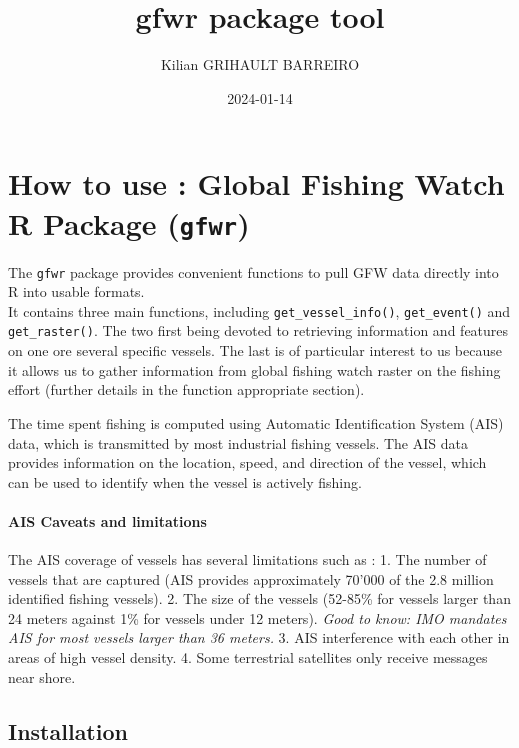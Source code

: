\documentclass[
]{article}
\title{gfwr package tool}
\author{Kilian GRIHAULT BARREIRO}
\date{2024-01-14}
\begin{document}
\maketitle

\hypertarget{how-to-use-global-fishing-watch-r-package-gfwr}{%
\section{\texorpdfstring{How to use : Global Fishing Watch R Package
(\texttt{gfwr})}{How to use : Global Fishing Watch R Package (gfwr)}}\label{how-to-use-global-fishing-watch-r-package-gfwr}}

The \texttt{gfwr} package provides convenient functions to pull GFW data
directly into R into usable formats.\\
It contains three main functions, including
\texttt{get\_vessel\_info()}, \texttt{get\_event()} and
\texttt{get\_raster()}. The two first being devoted to retrieving
information and features on one ore several specific vessels. The last
is of particular interest to us because it allows us to gather
information from global fishing watch raster on the fishing effort
(further details in the function appropriate section).

The time spent fishing is computed using Automatic Identification System
(AIS) data, which is transmitted by most industrial fishing vessels. The
AIS data provides information on the location, speed, and direction of
the vessel, which can be used to identify when the vessel is actively
fishing.

\hypertarget{ais-caveats-and-limitations}{%
\paragraph{AIS Caveats and
limitations}\label{ais-caveats-and-limitations}}

The AIS coverage of vessels has several limitations such as : 1. The
number of vessels that are captured (AIS provides approximately 70'000
of the 2.8 million identified fishing vessels). 2. The size of the
vessels (52-85\% for vessels larger than 24 meters against 1\% for
vessels under 12 meters). \emph{Good to know: IMO mandates AIS for most
vessels larger than 36 meters.} 3. AIS interference with each other in
areas of high vessel density. 4. Some terrestrial satellites only
receive messages near shore.

\hypertarget{installation}{%
\subsection{Installation}\label{installation}}
\end{document}
